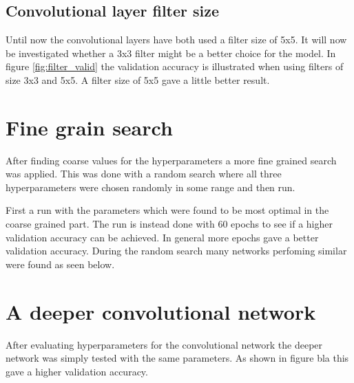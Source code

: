 
\FloatBarrier
\subsection{Convolutional layer filter size}
Until now the convolutional layers have both used a filter size of 5x5. It will now be investigated whether a 3x3 filter might be a better choice for the model. In figure \ref{fig:filter_valid} the validation accuracy is illustrated when using filters of size 3x3 and 5x5. A filter size of 5x5 gave a little better result.



\section{Fine grain search}
After finding coarse values for the hyperparameters a more fine grained search was applied. This was done with a random search where all three hyperparameters were chosen randomly in some range and then run.

First a run with the parameters which were found to be most optimal in the coarse grained part. The run is instead done with 60 epochs to see if a higher validation accuracy can be achieved. In general more epochs gave a better validation accuracy. During the random search many networks perfoming similar were found as seen below. 

\section{A deeper convolutional network}
After evaluating hyperparameters for the convolutional network the deeper network was simply tested with the same parameters. As shown in figure bla   this gave a higher validation accuracy.


